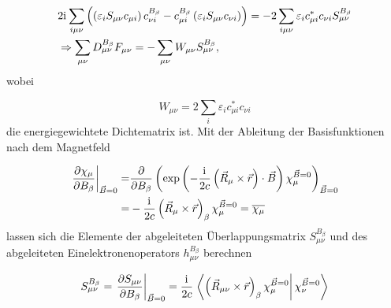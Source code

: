      \begin{equation}\label{eq:enweightd}
     \begin{aligned}
     &2\mathrm{i}\mkern1mu\sum_{i\mu\nu}\left(\left(\varepsilon_i S_{\mu\nu} c_{\mu i}\right) c_{\nu i}^{B_\beta} - c_{\mu i}^{B_\beta} \left(\varepsilon_i S_{\mu\nu} c_{\nu i}\right)\right)=-2\sum_{i\mu\nu}\varepsilon_i c_{\mu i}^*c_{\nu i}S_{\mu\nu}^{B_\beta}\\
     &\Rightarrow \sum_{\mu\nu}D_{\mu\nu}^{B_\beta}F_{\mu\nu}=-\sum_{\mu\nu}W_{\mu\nu} S_{\mu\nu}^{B_\beta},
     \end{aligned}
     \end{equation}
     wobei
     
     \begin{equation}
     W_{\mu\nu}=2\sum_{i}\varepsilon_i c_{\mu i}^*c_{\nu i}
     \end{equation}
     die energiegewichtete Dichtematrix ist.\supercite{pople1979derivative} Mit der Ableitung der Basisfunktionen nach dem Magnetfeld
     
     \begin{equation}
     \begin{aligned}
     \left.\frac{\partial \chi_\mu}{\partial B_\beta}\right\vert_{\vec{B}=0}=&\frac{\partial}{\partial B_\beta}\left(\exp\left(-\frac{\mathrm{i}\mkern1mu}{2c}\left(\vec{R}_\mu\times\vec{r} \right)\cdot \vec{B}\right)\chi_\mu^{\vec{B}=0}\right)_{\vec{B}=0}\\
     =&-\frac{\mathrm{i}\mkern1mu}{2c}\left(\vec{R}_\mu\times\vec{r}\right)_\beta\chi_\mu^{\vec{B}=0}=\overline{\chi_\mu}
     \end{aligned}
     \end{equation}
     lassen sich die Elemente der abgeleiteten Überlappungsmatrix $S_{\mu\nu}^{B_\beta}$ und des abgeleiteten Einelektronenoperators $h_{\mu\nu}^{B_\beta}$ berechnen
     
     \begin{equation}\label{eq:sdb}
     S_{\mu\nu}^{B_\beta}=\left.\frac{\partial S_{\mu\nu}}{\partial B_\beta} \right\vert_{\vec{B}=0}=\frac{\mathrm{i}\mkern1mu}{2c}\left.\left\langle\left(\vec{R}_{\mu\nu}\times\vec{r}\right)_\beta\chi_\mu^{\vec{B}=0}\right\vert\chi_\nu^{\vec{B}=0}\right\rangle
     \end{equation}
  	 
